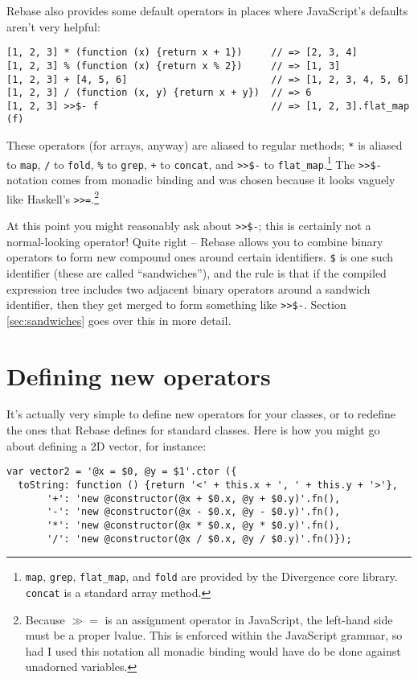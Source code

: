 \documentclass{report}
\begin{document}
      Rebase also provides some default operators in places where JavaScript's defaults aren't very helpful:

\begin{verbatim}
[1, 2, 3] * (function (x) {return x + 1})     // => [2, 3, 4]
[1, 2, 3] % (function (x) {return x % 2})     // => [1, 3]
[1, 2, 3] + [4, 5, 6]                         // => [1, 2, 3, 4, 5, 6]
[1, 2, 3] / (function (x, y) {return x + y})  // => 6
[1, 2, 3] >>$- f                              // => [1, 2, 3].flat_map (f)
\end{verbatim}

      These operators (for arrays, anyway) are aliased to regular methods; \verb|*| is aliased to \verb|map|, \verb|/| to \verb|fold|, \verb|%| to \verb|grep|, \verb|+| to \verb|concat|, and
      \verb|>>$-| to \verb|flat_map|.\footnote{{\tt map}, {\tt grep}, {\tt flat\_map}, and {\tt fold} are provided by the Divergence core library. {\tt concat} is a standard array method.} The
      \verb|>>$-| notation comes from monadic binding and was chosen because it looks vaguely like Haskell's \verb|>>=|.\footnote{Because $\gg=$ is an assignment operator in JavaScript, the
      left-hand side must be a proper lvalue. This is enforced within the JavaScript grammar, so had I used this notation all monadic binding would have do be done against unadorned
      variables.}

      At this point you might reasonably ask about \verb|>>$-|; this is certainly not a normal-looking operator! Quite right -- Rebase allows you to combine binary operators to form new compound
      ones around certain identifiers. \verb|$| is one such identifier (these are called ``sandwiches''), and the rule is that if the compiled expression tree includes two adjacent binary
      operators around a sandwich identifier, then they get merged to form something like \verb|>>$-|. Section \ref{sec:sandwiches} goes over this in more detail.

\section {Defining new operators}
      It's actually very simple to define new operators for your classes, or to redefine the ones that Rebase defines for standard classes. Here is how you might go about defining a 2D vector,
      for instance:

\begin{verbatim}
var vector2 = '@x = $0, @y = $1'.ctor ({
  toString: function () {return '<' + this.x + ', ' + this.y + '>'},
       '+': 'new @constructor(@x + $0.x, @y + $0.y)'.fn(),
       '-': 'new @constructor(@x - $0.x, @y - $0.y)'.fn(),
       '*': 'new @constructor(@x * $0.x, @y * $0.y)'.fn(),
       '/': 'new @constructor(@x / $0.x, @y / $0.y)'.fn()});
\end{verbatim}
\end{document}
